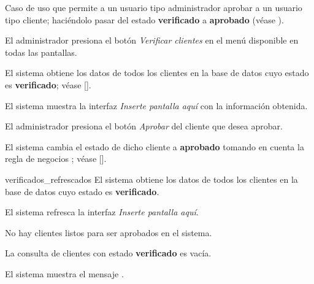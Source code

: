 %
%

{
  Caso de uso que permite a un usuario tipo administrador aprobar a un usuario
  tipo cliente; haciéndolo pasar del estado \textbf{verificado} a
  \textbf{aprobado} (véase ).

  \begin{trayectoriaPrincipal}

    \item El administrador presiona el botón \textit{Verificar clientes}
      en el menú disponible en todas las pantallas.

    \item El sistema obtiene los datos de todos los clientes en la base de datos
      cuyo estado es \textbf{verificado}; véase
      [].

    \item El sistema muestra la interfaz \textit{Inserte pantalla aquí} con la
      información obtenida.

    \item El administrador presiona el botón \textit{Aprobar} del cliente que
      desea aprobar.

    \item El sistema cambia el estado de dicho cliente a \textbf{aprobado}
      tomando en cuenta la regla de negocios ;
      véase [].

    \item [verificados_refrescados] El sistema obtiene los datos de todos los
      clientes en la base de datos cuyo estado es \textbf{verificado}.

    \item El sistema refresca la interfaz \textit{Inserte pantalla aquí}.

  \end{trayectoriaPrincipal}

  \begin{trayectoriaAlternativa}
    {No hay clientes listos para ser aprobados en el sistema.}

    \item La consulta de clientes con estado \textbf{verificado} es vacía.

    \item El sistema muestra el mensaje
      .


\end{trayectoriaAlternativa}}

